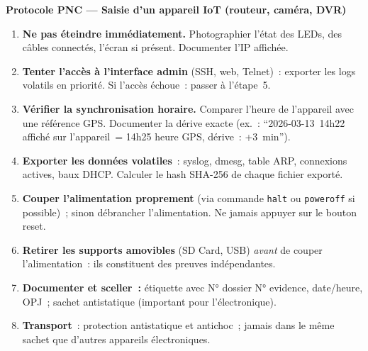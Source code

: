 \begin{boxPNC}
\textbf{Protocole PNC --- Saisie d'un appareil IoT (routeur, caméra, DVR)}

\begin{enumerate}
    \item \textbf{Ne pas éteindre immédiatement.}
          Photographier l'état des LEDs, des câbles connectés,
          l'écran si présent. Documenter l'IP affichée.
    \item \textbf{Tenter l'accès à l'interface admin} (SSH, web,
          Telnet)~: exporter les logs volatils en priorité.
          Si l'accès échoue~: passer à l'étape~5.
    \item \textbf{Vérifier la synchronisation horaire.}
          Comparer l'heure de l'appareil avec une référence GPS.
          Documenter la dérive exacte (ex.~: ``2026-03-13~14h22
          affiché sur l'appareil~= 14h25 heure GPS, dérive~: +3~min'').
    \item \textbf{Exporter les données volatiles}~: syslog, dmesg,
          table ARP, connexions actives, baux DHCP. Calculer le hash
          SHA-256 de chaque fichier exporté.
    \item \textbf{Couper l'alimentation proprement} (via commande
          \texttt{halt} ou \texttt{poweroff} si possible)~; sinon
          débrancher l'alimentation. Ne jamais appuyer sur le
          bouton reset.
    \item \textbf{Retirer les supports amovibles} (SD Card, USB)
          \emph{avant} de couper l'alimentation~: ils constituent
          des preuves indépendantes.
    \item \textbf{Documenter et sceller~:} étiquette avec N° dossier
          N° evidence, date/heure, OPJ~; sachet antistatique
          (important pour l'électronique).
    \item \textbf{Transport}~: protection antistatique et
          antichoc~; jamais dans le même sachet que d'autres
          appareils électroniques.
\end{enumerate}
\end{boxPNC}

\separateur

